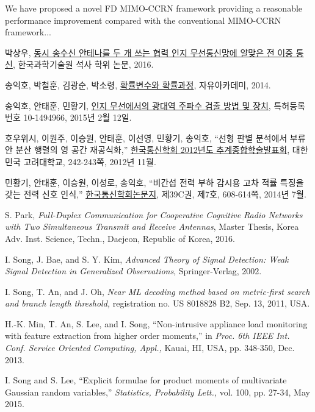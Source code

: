 \documentclass[master,english,final]{kaist-ucs}
\begin{document}
	We have proposed a novel FD MIMO-CCRN framework providing a reasonable performance improvement compared with the conventional MIMO-CCRN framework...
	\begin{thebibliography}{00}

		 박상우, \underline{동시 송수신 안테나를 두 개 쓰는 협력 인지 무선통신망에 알맞은 전 이중 통신}, 한국과학기술원 석사 학위 논문, 2016.

		 송익호, 박철훈, 김광순, 박소령, \underline{확률변수와 확률과정}, 자유아카데미, 2014.

		 송익호, 안태훈, 민황기, \underline{인지 무선에서의 광대역 주파수 검출 방법 및 장치}, 특허등록번호 10-1494966, 2015년 2월 12일.

		 호우위시, 이원주, 이승원, 안태훈, 이선영, 민황기, 송익호, “선형 판별 분석에서 부류안 분산 행렬의 영 공간 재공식화,” \underline{한국통신학회 2012년도 추계종합학술발표회}, 대한민국 고려대학교, 242-243쪽, 2012년 11월.

		 민황기, 안태훈, 이승원, 이성로, 송익호, “비간섭 전력 부하 감시용 고차 적률 특징을 갖는 전력 신호 인식,” \underline{한국통신학회논문지}, 제39C권, 제7호, 608-614쪽, 2014년 7월.



		 S. Park, \textit{Full-Duplex Communication for Cooperative Cognitive Radio Networks with Two Simultaneous Transmit and Receive Antennas}, Master Thesis, Korea Adv. Inst. Science, Techn., Daejeon, Republic of Korea, 2016.

		  I. Song, J. Bae, and S. Y. Kim, \textit{Advanced Theory of Signal Detection: Weak Signal Detection in Generalized Observations}, Springer-Verlag, 2002.

		 I. Song, T. An, and J. Oh, \textit{Near ML decoding method based on metric-first search and branch length threshold,} registration no. US 8018828 B2, Sep. 13, 2011, USA.

		 H.-K. Min, T. An, S. Lee, and I. Song, “Non-intrusive appliance load monitoring with feature extraction from higher order moments,” in \textit{Proc. 6th IEEE Int. Conf. Service Oriented Computing, Appl.,} Kauai, HI, USA, pp. 348-350, Dec. 2013.

		 I. Song and S. Lee, “Explicit formulae for product moments of multivariate Gaussian random variables,” \textit{Statistics, Probability Lett.,} vol. 100, pp. 27-34, May 2015.


	\end{thebibliography}
\end{document}
